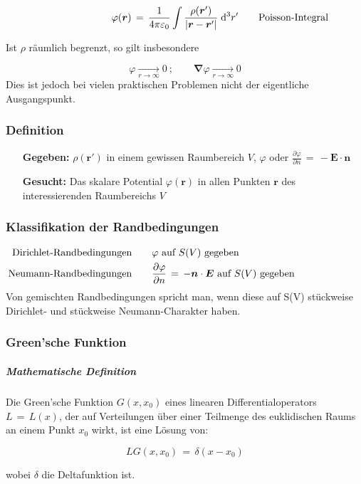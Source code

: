 \documentclass[titlepage,11pt,a4paper,ngerman]{report}
\renewcommand{\vec}[1]{\bm{#1}}
\renewcommand{\epsilon}{\varepsilon}
\newcommand{\vabla}{\vec{\nabla}}
\renewcommand{\paragraph}[1]{\subsubsection{#1}}
\begin{document}
\[\varphi(\vec{r})\,=\,\frac{1}{4\pi\epsilon_0}\int\frac{\rho(\vec{r}')}{\left|\vec{r}-\vec{r}'\right|}\;\mathrm{d}^3r'\qquad\rlap{Poisson-Integral}\]

Ist $\rho$ räumlich begrenzt, so gilt insbesondere

\[\varphi\xrightarrow[r\rightarrow\infty]{}0\ ;\qquad\vabla\varphi\xrightarrow[r\rightarrow\infty]{}0\]
\noindent
Dies ist jedoch bei vielen praktischen Problemen nicht der eigentliche Ausgangspunkt.

\paragraph{Definition}
\begin{itemize}[leftmargin=3cm]
	\item[\textbf{Gegeben:}] $\rho(\vec{r}')$ in einem gewissen Raumbereich $V$, $\varphi$ oder $\frac{\partial\varphi}{\partial n}\,=\,-\vec{E}\cdot \vec{n}$
	\item[\textbf{Gesucht:}] Das skalare Potential $\varphi(\vec{r})$ in allen Punkten $\vec{r}$ des interessierenden Raumbereichs $V$
\end{itemize}

\paragraph{Klassifikation der Randbedingungen}
\begin{align*}\hspace{2cm}
\llap{Dirichlet-Randbedingungen}\qquad&\varphi\ \text{auf}\ S(V)\ \text{gegeben}\\
\llap{Neumann-Randbedingungen}\qquad&\frac{\partial\varphi}{\partial n}\,=\,-\vec{n}\cdot\vec{E}\ \text{auf}\ S(V)\ \text{gegeben}
\end{align*}
\noindent
Von gemischten Randbedingungen spricht man, wenn diese auf S(V) stückweise Dirichlet- und stückweise Neumann-Charakter haben.

\paragraph{Green'sche Funktion}
\subparagraph{Mathematische Definition}
Die Green'sche Funktion $G(x, x_0)$ eines linearen Differentialoperators $L\,=\,L(x)$, der auf Verteilungen über einer Teilmenge des euklidischen Raums an einem Punkt $x_0$ wirkt, ist eine Lösung von:

\[LG(x,x_0)\,=\,\delta(x-x_0)\]

wobei $\delta$ die Deltafunktion ist.
\end{document}
